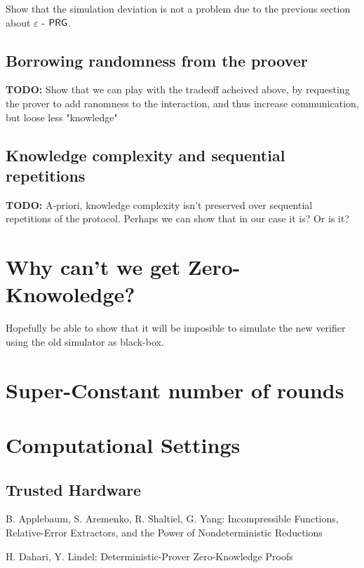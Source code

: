 \documentclass[11]{article}
\begin{document}
Show that the simulation deviation is not a problem due to the previous section about $\varepsilon$ - $\mathsf{PRG}$.

\subsection{Borrowing randomness from the proover}
\textbf{TODO:}
Show that we can play with the tradeoff acheived above, by requesting the prover to add ranomness to the interaction, and thus increase communication, but loose less "knowledge"

\subsection{Knowledge complexity and sequential repetitions}
\textbf{TODO:}
A-priori, knowledge complexity isn't preserved over sequential repetitions of the protocol. Perhaps we can show that in our case it is? Or is it?

\section{Why can't we get Zero-Knowoledge?}
	\item Hopefully be able to show that it will be imposible to simulate the new verifier using the old simulator as black-box.	

\section{Super-Constant number of rounds}

\section{Computational Settings}

\subsection{Trusted Hardware}

\begin{thebibliography}{}
 B. Applebaum, S. Aremenko, R. Shaltiel, G. Yang: Incompressible Functions, Relative-Error Extractors, and the Power
of Nondeterministic Reductions

 H. Dahari, Y. Lindel: Deterministic-Prover Zero-Knowledge Proofs

\end{thebibliography}
\end{document}
